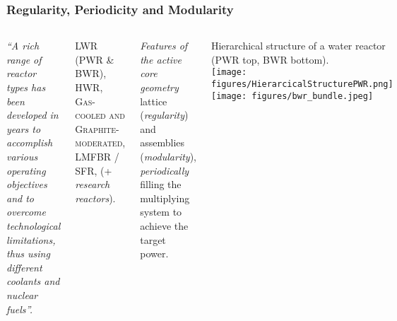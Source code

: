 \begin{frame}
  \frametitle{Regularity, Periodicity and Modularity}
  \begin{columns}
  \vspace{-5mm}
    \begin{block}{}{ \sl
    ``A rich range of reactor types has been developed in years to accomplish various operating objectives and to overcome technological limitations, thus using different coolants and nuclear fuels''.}
    \end{block}
    \begin{exampleblock}{}
    \begin{flushright}
      \textsc{LWR (PWR \& BWR), HWR, Gas-cooled and Graphite-moderated, LMFBR / SFR}, (+ \emph{research reactors}).
    \end{flushright}
    \end{exampleblock}
    \vspace{5mm}
    \vspace{5mm}
    \begin{block}{\sl Features of the active core geometry}
      \textcolor{ceared1}{lattice} (\emph{regularity}) and \textcolor{ceared1}{assemblies} (\emph{modularity}), \emph{periodically} filling the multiplying system to achieve the target power.
    \end{block}
     \centering
    {
    Hierarchical structure of a water reactor (PWR top, BWR bottom).}\\
    \texttt{[image: figures/HierarcicalStructurePWR.png]}\\[2mm]
    \texttt{[image: figures/bwr\_bundle.jpeg]}
  \end{columns}
\end{frame}
